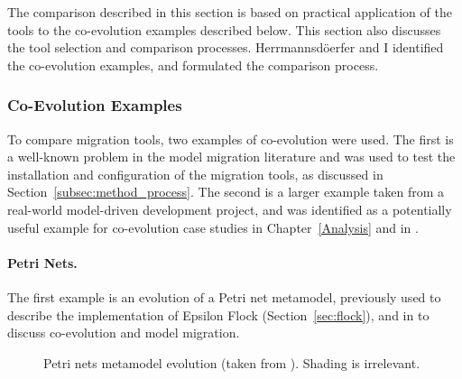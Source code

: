 \newcommand{\mm}[1]{\texttt{#1}}
The comparison described in this section is based on practical application of the tools to the co-evolution examples described below. This section also discusses the tool selection and comparison processes. Herrmannsd\"{o}erfer and I identified the co-evolution examples, and formulated the comparison process.

\subsubsection{Co-Evolution Examples}
\label{subsec:method_examples}
To compare migration tools, two examples of co-evolution were used. The first is a well-known problem in the model migration literature and was used to test the installation and configuration of the migration tools, as discussed in Section~\ref{subsec:method_process}. The second is a larger example taken from a real-world model-driven development project, and was identified as a potentially useful example for co-evolution case studies in Chapter~\ref{Analysis} and in \cite{herrmannsdoerfer09gmf}.

\paragraph{Petri Nets.}
The first example is an evolution of a Petri net metamodel, previously used to describe the implementation of Epsilon Flock (Section~\ref{sec:flock}), and in \cite{cicchetti08automating,garces09managing,wachsmuth07metamodel} to discuss co-evolution and model migration.

\begin{figure}[htbp]
	\centering
	\caption[Exemplar metamodel evolution (Petri nets)]{Petri nets metamodel evolution (taken from \cite{rose10flock}). Shading is irrelevant.}
\label{fig:petri_nets_mms_repeated}
\end{figure}

